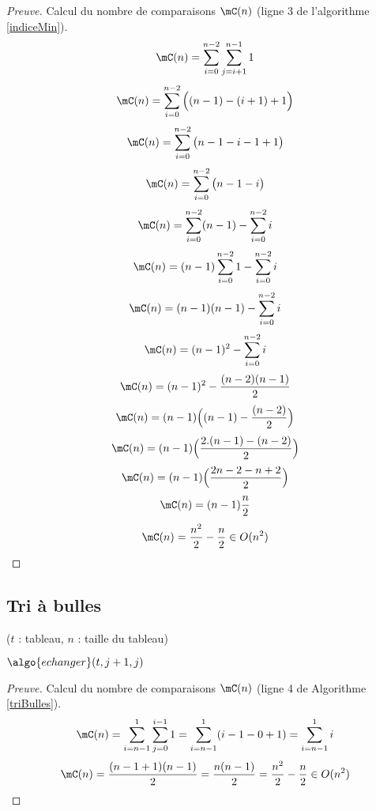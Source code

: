 \begin{proof}[Preuve]
Calcul du nombre de comparaisons $\mC(n)$ 
(ligne 3 de l'algorithme \ref{indiceMin}).
$$
\mC(n) = \sum_{i=0}^{n-2} \sum_{j=i+1}^{n-1} 1
$$
%
$$
\mC(n)
 = \sum_{i=0}^{n-2} 
								\Big(
										(n-1) - (i+1) + 1 
								\Big)
$$
%
$$
\mC(n)
 = \sum_{i=0}^{n-2} 
								\big(
										n-1 - i-1 + 1 
								\big)
$$
%
$$
\mC(n)
 = \sum_{i=0}^{n-2} 
								\big(
										n-1 - i 
								\big)
$$
%
$$
\mC(n) = 
 \sum_{i=0}^{n-2} (n-1)
-  \sum_{i=0}^{n-2} i
$$
%
$$
\mC(n) = 
 (n-1) \sum_{i=0}^{n-2} 1
-  \sum_{i=0}^{n-2} i
$$
%
$$
\mC(n) = 
	(n-1)(n-1)
	- \sum_{i=0}^{n-2} i 	
$$
%
$$
\mC(n) = 
	(n-1)^2
	- \sum_{i=0}^{n-2} i 	
$$
$$
\mC(n) = 
	(n-1)^2
	- \frac{(n-2)(n-1)} {2}
$$
%
$$
\mC(n) = 
	(n-1)
	\Big(
		(n-1)
		-\frac{(n-2) } {2}
	\Big)
$$
%
$$
\mC(n) = 
	(n-1)
	\Big(
		\frac{2.(n-1) -(n-2) } {2}
	\Big)
$$
%
$$
\mC(n) = 
	(n-1)
	\Big(
		\frac{2n-2 - n+ 2 } {2}
	\Big)
$$
%
$$
\mC(n) = 
	(n-1)
	\frac{n} {2}
$$
$$
\mC(n) = 
 	\frac{n^2}{2}
	-
	\frac{n}{2} \in O(n^2)
  	$$
\end{proof}


\subsection{Tri à bulles}

\begin{algorithm}[H]
\caption{($t$ : tableau, $n$ : taille du tableau)}
\label{triBulles}
\begin{algorithmic}[1]
			\State $\algo{echanger}(t, j+1, j)$
		\EndIf
	\EndFor
\EndFor
\end{algorithmic}
\end{algorithm}





\begin{proof}[Preuve]
Calcul du nombre de comparaisons $\mC(n)$ (ligne 4 de Algorithme \ref{triBulles}).
$$
\mC(n) = 
	\sum_{i=n-1}^{1} \sum_{j=0}^{i-1} 1 
 =
 	\sum_{i=n-1}^{1} (i-1-0+1) 
 = 
  	\sum_{i=n-1}^{1} i 
$$
%
$$
\mC(n) = 
   	\frac{(n-1+1) (n-1)}{2}
 =
    \frac{n (n-1)}{2}
 = \frac{n^2}{2} - \frac{n}{2} \in O(n^2)
  	$$
\end{proof}

